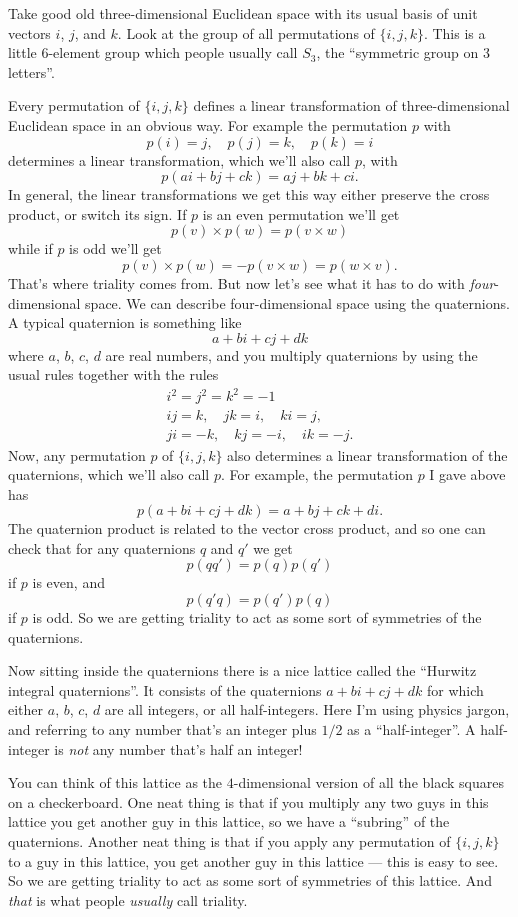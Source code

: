 \documentclass{article}
\begin{document}
Take good old three-dimensional Euclidean space with its usual basis of
unit vectors \(i\), \(j\), and \(k\). Look at the group of all
permutations of \(\{i,j,k\}\). This is a little 6-element group which
people usually call \(S_3\), the ``symmetric group on 3 letters''.

Every permutation of \(\{i,j,k\}\) defines a linear transformation of
three-dimensional Euclidean space in an obvious way. For example the
permutation \(p\) with \[p(i) = j, \quad p(j) = k, \quad p(k) = i\]
determines a linear transformation, which we'll also call \(p\), with
\[p(ai+ bj + ck) = aj + bk + ci.\] In general, the linear
transformations we get this way either preserve the cross product, or
switch its sign. If \(p\) is an even permutation we'll get
\[p(v)\times p(w) = p(v\times w)\] while if \(p\) is odd we'll get
\[p(v)\times p(w) = -p(v\times w) = p(w\times v).\] That's where
triality comes from. But now let's see what it has to do with
\emph{four}-dimensional space. We can describe four-dimensional space
using the quaternions. A typical quaternion is something like
\[a + bi + cj + dk\] where \(a\), \(b\), \(c\), \(d\) are real numbers,
and you multiply quaternions by using the usual rules together with the
rules \[
  \begin{gathered}
    i^2 = j^2 = k^2 = -1
  \\ij=k,\quad jk=i,\quad ki=j,
  \\ji=-k,\quad kj=-i,\quad ik=-j.
  \end{gathered}
\] Now, any permutation \(p\) of \(\{i,j,k\}\) also determines a linear
transformation of the quaternions, which we'll also call \(p\). For
example, the permutation \(p\) I gave above has
\[p(a + bi + cj + dk) = a + bj + ck + di.\] The quaternion product is
related to the vector cross product, and so one can check that for any
quaternions \(q\) and \(q'\) we get \[p(qq') = p(q)p(q')\] if \(p\) is
even, and \[p(q'q) = p(q')p(q)\] if \(p\) is odd. So we are getting
triality to act as some sort of symmetries of the quaternions.

Now sitting inside the quaternions there is a nice lattice called the
``Hurwitz integral quaternions''. It consists of the quaternions
\(a + bi + cj + dk\) for which either \(a\), \(b\), \(c\), \(d\) are all
integers, or all half-integers. Here I'm using physics jargon, and
referring to any number that's an integer plus \(1/2\) as a
``half-integer''. A half-integer is \emph{not} any number that's half an
integer!

You can think of this lattice as the \(4\)-dimensional version of all
the black squares on a checkerboard. One neat thing is that if you
multiply any two guys in this lattice you get another guy in this
lattice, so we have a ``subring'' of the quaternions. Another neat thing
is that if you apply any permutation of \(\{i,j,k\}\) to a guy in this
lattice, you get another guy in this lattice --- this is easy to see. So
we are getting triality to act as some sort of symmetries of this
lattice. And \emph{that} is what people \emph{usually} call triality.
\end{document}
